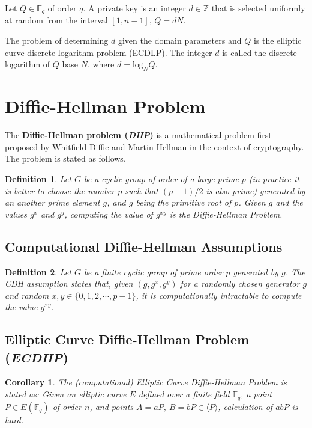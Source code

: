 \documentclass[a4paper,12pt]{report}
\newtheorem{definition}{Definition}
\newtheorem{corollary}{Corollary}
\begin{document}
Let $Q \in \mathbb{F}_q$ of order $q$. A private key is an integer
$d \in \mathbb{Z}$ that is selected uniformly at random from the
interval $[1,n-1]$,  $Q = dN$.

The problem of determining $d$ given the domain parameters and $Q$
is the elliptic curve discrete logarithm problem (ECDLP). The
integer $d$ is called the discrete logarithm of $Q$ base $N$, where
$d= \mbox{log}_{N}Q$.


\section{Diffie-Hellman Problem}
The \textbf{Diffie-Hellman problem (\textit{DHP})} is a mathematical
problem first proposed by Whitfield Diffie and Martin Hellman
\cite{diffie} in the context of cryptography. The problem is stated
as follows.

\begin{definition}
Let $G$ be a cyclic group of order of a large prime $p$ (in practice
it is better to choose the number $p$ such that $(p-1)/2$ is also
prime) generated by an another prime element $g$, and $g$ being the
primitive root of $p$. Given $g$ and the values $g^x$ and $g^y$,
computing the value of $g^{xy}$ is the Diffie-Hellman Problem.
\end{definition}
\subsection{Computational Diffie-Hellman Assumptions}
\begin{definition}
Let $G$ be a finite cyclic group of prime order $p$ generated by
$g$. The CDH assumption states that, given $(g, g^{x}, g^{y})$ for a
randomly chosen generator $g$ and random $x, y \in \{0, 1, 2,
\cdots, p-1\}$, it is computationally intractable to compute the
value $g^{xy}$.
\end{definition}

\subsection{Elliptic Curve Diffie-Hellman Problem (\textit{ECDHP})}
\begin{corollary}
The (computational) Elliptic Curve Diffie-Hellman Problem is stated
as: Given an elliptic curve $E$ defined over a finite field
$\mathbb{F}_q$, a point $P \in E(\mathbb{F}_q)$ of order $n$, and
points $A = aP$, $B = bP \in \langle P \rangle$, calculation of
$abP$ is hard.
\end{corollary}
\end{document}
